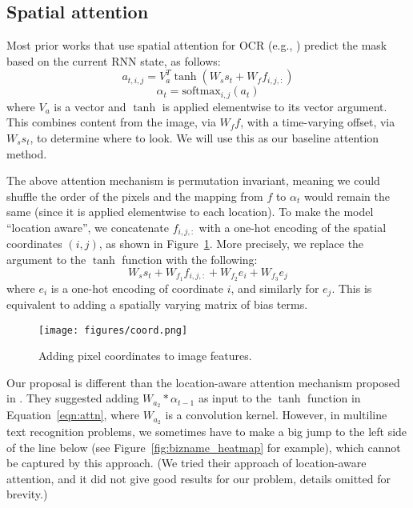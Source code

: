 \documentclass[conference]{IEEEtran}
\newcommand{\be}{\begin{equation}}
\newcommand{\ee}{\end{equation}}
\begin{document}
\subsection{Spatial attention}
\label{sec:attn}

Most prior works that use spatial attention for OCR
(e.g., \cite{lee2016recursive,shi2015end,shi2016robust,he2016text, bluche2016scan, bluche2016joint})
predict the mask based on the current RNN state, as follows:
\be
a_{t,i,j} = V_a^T \tanh(W_s s_t + W_f f_{i,j,:})
\label{eqn:attn}
\ee
\be
\alpha_t = \mathrm{softmax}_{i,j}(a_t)
\label{eqn:attn2}
\ee
where $V_a$ is a vector and $\tanh$ is applied elementwise to its vector argument.
This combines content from the image, via $W_f f$, with a time-varying
offset, via $W_s s_t$, to determine where to look.
We will use this as our baseline attention method.


The above attention mechanism is permutation invariant, meaning we
could shuffle the order of the pixels and the mapping from $f$ to
$\alpha_t$ would remain the same (since it is applied elementwise to
each location). To make the model ``location aware'', we concatenate
$f_{i,j,:}$ with a one-hot encoding of the spatial coordinates
$(i,j)$,
as shown in  Figure~\ref{fig:coord}.
More precisely,
we replace the argument to the $\tanh$ function with the following:
\be
W_s s_t + W_{f_1} f_{i,j,:}  + W_{f_2}  e_i + W_{f_3}  e_j
\ee
where $e_i$ is a one-hot encoding of coordinate $i$,
and similarly for $e_j$.
This is equivalent to adding a spatially varying matrix of bias terms.


\begin{figure}
\begin{center}
\texttt{[image: figures/coord.png]}
\caption{Adding pixel coordinates to image features.}
\label{fig:coord}
\end{center}
\end{figure}


Our proposal is different than the location-aware attention mechanism
proposed in \cite{chorowski2015attention}. They suggested adding
$W_{a_2}*\alpha_{t-1}$ as input to the $\tanh$ function in
Equation~\ref{eqn:attn}, where $W_{a_2}$ is a convolution
kernel. However, in multiline text recognition problems, we sometimes
have to make a big jump to the left side of the line below
(see Figure~\ref{fig:bizname_heatmap} for example),
which cannot be captured by this approach.
(We tried their approach of location-aware attention, and it did not give good results for our problem, details omitted for brevity.)
\end{document}
